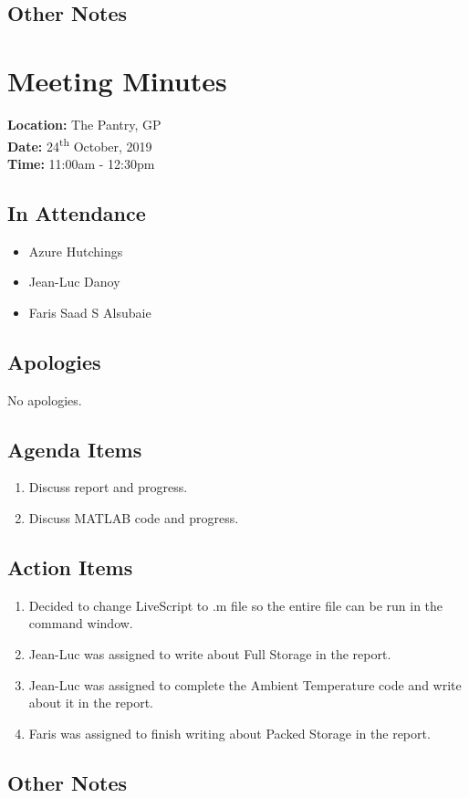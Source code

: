 \documentclass{article}
\begin{document}
\subsection*{Other Notes}

\pagebreak

\section{Meeting Minutes}
\textbf{Location:} The Pantry, GP\\
\textbf{Date:} 24\textsuperscript{th} October, 2019 \\
\textbf{Time:} 11:00am - 12:30pm

\subsection*{In Attendance}
\begin{itemize}
\item Azure Hutchings
\item Jean-Luc Danoy
\item Faris Saad S Alsubaie
\end{itemize}

\subsection*{Apologies}
No apologies. 

\subsection*{Agenda Items}
\begin{enumerate} 
\item Discuss report and progress.
\item Discuss MATLAB code and progress.
\end{enumerate}

\subsection*{Action Items}
\begin{enumerate}
\item Decided to change LiveScript to .m file so the entire file can be run in the command window.
\item Jean-Luc was assigned to write about Full Storage in the report.
\item Jean-Luc was assigned to complete the Ambient Temperature code and write about it in the report.
\item Faris was assigned to finish writing about Packed Storage in the report.
\end{enumerate}

\subsection*{Other Notes}
\end{document}
